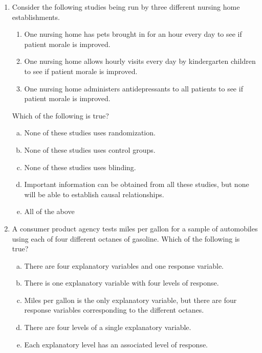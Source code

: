 \documentclass[a4paper,12pt,twoside]{book}
\begin{document}
\begin{enumerate}
  \item Consider the following studies being run by three different nursing home establishments.
     \begin{enumerate}[\Roman*.]
         \item One nursing home has pets brought in for an hour every day to see if patient morale is improved.
         \item One nursing home allows hourly visits every day by kindergarten children to see if patient morale is improved.
         \item One nursing home administers antidepressants to all patients to see if patient morale is improved.
     \end{enumerate}
     Which of the following is true?
       \begin{enumerate}[(a)]
          \item None of these studies uses randomization.
          \item None of these studies uses control groups.
          \item None of these studies uses blinding.
          \item Important information can be obtained from all these studies, but none will be able to establish causal relationships.
          \item  All of the above
       \end{enumerate}
   
   \item A consumer product agency tests miles per gallon for a sample of automobiles using each of four different octanes of gasoline. Which of the following is true?
      \begin{enumerate}[(a)]
      \item There are four explanatory variables and one response variable.
      \item There is one explanatory variable with four levels of response.
      \item Miles per gallon is the only explanatory variable, but there are four response variables corresponding to the different octanes.
      \item There are four levels of a single explanatory variable.
      \item Each explanatory level has an associated level of response.
    \end{enumerate}           
       

\end{enumerate}
\end{document}
